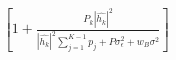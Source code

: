 \documentclass[preview]{standalone}
\begin{document}
\begin{align*}
\left[1 + \frac{P_k \left|\hat{h_k}\right|^2}{\left|\hat{h_k}\right|^2 \sum_{j=1}^{K-1} {p_j} + P \sigma_{\epsilon}^2 + w_B \sigma^2}\right]
\end{align*}
\end{document}

